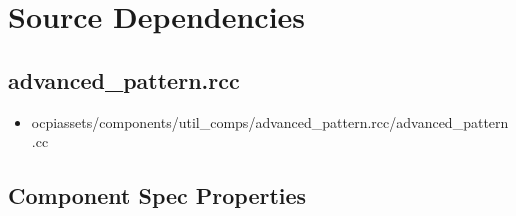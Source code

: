 \documentclass{article}
\def\comp{advanced\_pattern}
\begin{document}
\section*{Source Dependencies}
\subsection*{\comp.rcc}
\begin{itemize}
	\item ocpiassets/components/util\_comps/advanced\_pattern.rcc/advanced\_pattern.cc
\end{itemize}

\begin{landscape}
	\section*{Component Spec Properties}
	\begin{scriptsize}
		\begin{minipage}{\textwidth}
			\renewcommand*\footnoterule{} %
			\renewcommand{\thempfootnote}{\arabic{mpfootnote}} %


\end{minipage}
\end{scriptsize}
\end{landscape}
\end{document}

